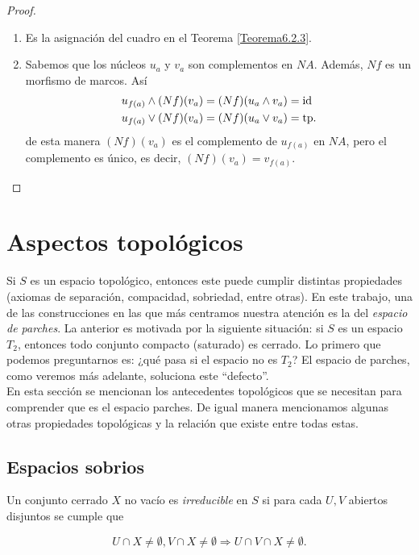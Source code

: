 \begin{proof}
    \begin{enumerate}
        \item Es la asignación del cuadro en el Teorema \ref{Teorema6.2.3}.
        \item Sabemos que los núcleos $u_a$ y $v_a$ son complementos en $NA$. Además, $Nf$ es un morfismo de marcos. Así 
        \[
        \begin{split}
        u_{f(a)}\wedge (Nf)(v_a)&=(Nf)(u_a\wedge v_a)=\mathrm{id}\\  u_{f(a)}\vee (Nf)(v_a)&=(Nf)(u_a\vee v_a)=\mathrm{tp}.
        \end{split}
        \]
        de esta manera $(Nf)(v_a)$ es el complemento de $u_{f(a)}$ en $NA$, pero el complemento es único, es decir, $(Nf)(v_a)=v_{f(a)}$.
    \end{enumerate}
\end{proof}


\section{Aspectos topológicos}\label{Topología}

Si $S$ es un espacio topológico, entonces este puede cumplir distintas propiedades (axiomas de separación, compacidad, sobriedad, entre otras). En este trabajo, una de las construcciones en las que más centramos nuestra atención es la del \emph{espacio de parches}. La anterior es motivada por la siguiente situación: si $S$ es un espacio $T_2$, entonces todo conjunto compacto (saturado) es cerrado. 
Lo primero que podemos preguntarnos es: ¿qué pasa si el espacio no es $T_2$? El espacio de parches, como veremos más adelante, soluciona este ``defecto''.\\
    
En esta sección se mencionan los antecedentes topológicos que se necesitan para comprender que es el espacio parches. 
De igual manera mencionamos algunas otras propiedades topológicas y la relación que existe entre todas estas.

\subsection{Espacios sobrios}\label{Espacios sobrios}

\begin{dfn}\label{irreducible}
    Un conjunto cerrado $X$ no vacío es \emph{irreducible} en $S$ si para cada $U, V$ abiertos disjuntos se cumple que 

    \[
    U\cap X\neq \emptyset, V\cap X\neq \emptyset \Rightarrow U\cap V\cap X\neq \emptyset.
    \]
\end{dfn}

